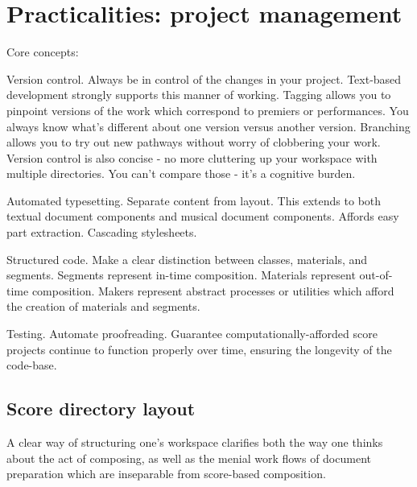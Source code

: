 \chapter{Practicalities: project management}
\label{chap:practicalities}

Core concepts:

Version control. Always be in control of the changes in your project.
Text-based development strongly supports this manner of working.
Tagging allows you to pinpoint versions of the work which correspond to
premiers or performances. You always know what's different about one version
versus another version. Branching allows you to try out new pathways without
worry of clobbering your work. Version control is also concise - no more
cluttering up your workspace with multiple directories. You can't compare those
- it's a cognitive burden.

Automated typesetting. Separate content from layout. This extends to both
textual document components and musical document components. Affords easy part
extraction. Cascading stylesheets.

Structured code. Make a clear distinction between classes, materials, and
segments. Segments represent in-time composition. Materials represent
out-of-time composition. Makers represent abstract processes or utilities which
afford the creation of materials and segments.

Testing. Automate proofreading. Guarantee computationally-afforded score
projects continue to function properly over time, ensuring the longevity of the
code-base.

\section{Score directory layout}

A clear way of structuring one's workspace clarifies both the way one thinks
about the act of composing, as well as the menial work flows of document
preparation which are inseparable from score-based composition.

